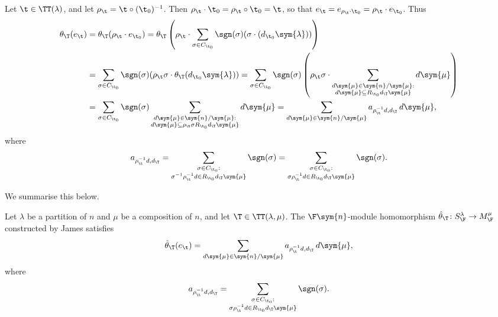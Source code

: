Let $\t \in \TT(\lambda)$, and let $\rho_{\t} = \t \circ (\t_0)^{-1}$. Then $\rho_{\t} \cdot \t_0 = \rho_{\t} \circ \t_0 = \t$, so that $e_{\t} = e_{\rho_{\t} \cdot \t_0} = \rho_{\t} \cdot e_{\t_0}$. Thus
\begin{align*}\allowdisplaybreaks
\theta_{\T}(e_{\t}) &= \theta_{\T}(\rho_{\t} \cdot e_{\t_0})
= \theta_{\T}\left (\rho_{\t} \cdot \sum_{\sigma \in C_{\t_0}} \sgn(\sigma) (\sigma \cdot (d_{\t_0} \sym{\lambda}))\right ) \\
&= \sum_{\sigma \in C_{\t_0}} \sgn(\sigma) (\rho_{\t} \sigma \cdot \theta_{\T}(d_{\t_0} \sym{\lambda}))
= \sum_{\sigma \in C_{\t_0}} \sgn(\sigma) \left(\rho_{\t}\sigma \cdot \sum_{\substack{d\sym{\mu} \in \sym{n}/\sym{\mu} : \\ d\sym{\mu} \subseteq R_{\t_0} d_\T \sym{\mu}}} d \sym{\mu} \right) \\
&= \sum_{\sigma \in C_{\t_0}} \sgn(\sigma) \sum_{\substack{d\sym{\mu} \in \sym{n}/\sym{\mu} : \\ d\sym{\mu} \subseteq \rho_{\t} \sigma R_{\t_0} d_\T \sym{\mu}}} d \sym{\mu}
= \sum_{d \sym{\mu} \in \sym{n}/\sym{\mu}} a_{\rho_\t^{-1}d,d_\T} \, d\sym{\mu},
\end{align*}where
\begin{gather*}
a_{\rho_\t^{-1}d,d_\T}= \sum_{\substack{\sigma \in C_{\t_0} : \\ \sigma^{-1} \rho_{\t}^{-1} d \in R_{\t_0} d_{\T} \sym{\mu}}} \sgn(\sigma) =
\sum_{\substack{\sigma \in C_{\t_0} : \\ \sigma \rho_{\t}^{-1} d \in R_{\t_0} d_{\T} \sym{\mu}}} \sgn(\sigma).
\end{gather*}

We summarise this below.

\begin{Theorem} \label{T:JamesTheta}
Let $\lambda$ be a partition of $n$ and $\mu$ be a composition of $n$, and
let $\T \in \TT(\lambda,\mu)$.
The $\F\sym{n}$-module homomorphism $\hat{\theta}_{\T} \colon S_\F^{\lambda} \to M_\F^{\mu}$ constructed by James satisfies
\begin{gather*}
\hat{\theta}_{\T}(e_{\t}) = \sum_{d \sym{\mu} \in \sym{n}/\sym{\mu}} a_{\rho_\t^{-1}d,d_\T} \, d\sym{\mu},
\end{gather*} where
\begin{gather*}
a_{\rho_\t^{-1}d,d_\T} = \sum_{\substack{\sigma \in C_{\t_0} : \\ \sigma \rho_{\t}^{-1} d \in R_{\t_0} d_{\T} \sym{\mu}}} \sgn(\sigma).
\end{gather*}
\end{Theorem}

